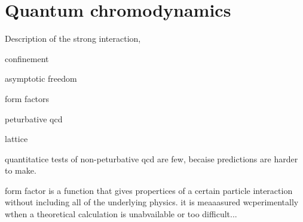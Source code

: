 \section{Quantum chromodynamics}

Description of the strong interaction,

confinement

asymptotic freedom

form factors

peturbative qcd

lattice

quantitatice tests of non-peturbative qcd are few, becaise predictions are harder to make.

form factor is a function that gives propertices of a certain particle interaction without
including all of the underlying physics.
it is meaaasured wcperimentally wthen a theoretical calculation is unabvailable or too difficult...
